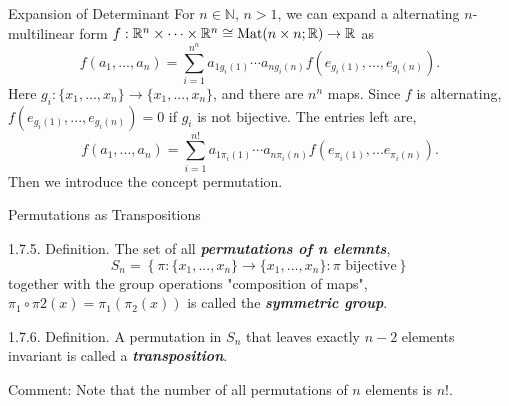 \documentclass[hyperref={pdfpagelabels=true}]{beamer}
\newcommand{\N}{\mathbb{N}}
\newcommand{\Mat}{\text{Mat}}
\newcommand{\highlightg}[1]{\textcolor[rgb]{0.1,0.5,0.3}{\emph{\textbf{#1}}}}
\newcommand{\<}{\langle}
\renewcommand{\>}{\rangle}
\begin{document}
    \begin{frame}{Expansion of Determinant}
        For $n \in \N$, $n>1$, we can expand a alternating $n$-multilinear form $f:\R^{n} \times \cdots \times \R^{n} \cong \Mat(n \times n;\R) \rightarrow \R$ as
        \[f(a_{1},...,a_{n}) = \sum_{i = 1}^{n^{n}}a_{1g_{i}(1)} \cdots a_{ng_{i}(n)}f(e_{g_{i}(1)},...,e_{g_{i}(n)}).\]
        Here $g_{i} :\{x_{1},...,x_{n}\}\rightarrow \{x_{1},...,x_{n}\}$, and there are $n^{n}$ maps. Since $f$ is alternating, $f(e_{g_{i}(1)},...,e_{g_{i}(n)}) = 0$ if $g_{i}$ is not bijective. The entries left are,
        \[f(a_{1},...,a_{n}) = \sum_{i = 1}^{n!}a_{1\pi_{i}(1)} \cdots a_{n\pi_{i}(n)}f(e_{\pi_{i}(1)},...e_{\pi_{i}(n)}).\]
        Then we introduce the concept permutation.
    \end{frame}
    \begin{frame}{Permutations as Transpositions}
        \begin{block}{1.7.5. Definition.}
            The set of all \highlightg{permutations of n elemnts},
            \[
                S_{n} = \left\{\pi:\{x_{1},...,x_{n}\} \rightarrow \{x_{1},...,x_{n}\}:\pi \text{ bijective}\right\}
            \]
            together with the group operations "composition of maps", $\pi_{1} \circ \pi{2}(x) = \pi_{1}(\pi_{2}(x))$ is called the \highlightg{symmetric group}.
        \end{block}
        \begin{block}{1.7.6. Definition.}
            A permutation in $S_{n}$ that leaves exactly $n-2$ elements invariant is called a \highlightg{transposition}.
        \end{block}
        \begin{block}{Comment:}
            Note that the number of all permutations of $n$ elements is $n!$.
        \end{block}
    \end{frame}
\end{document}
